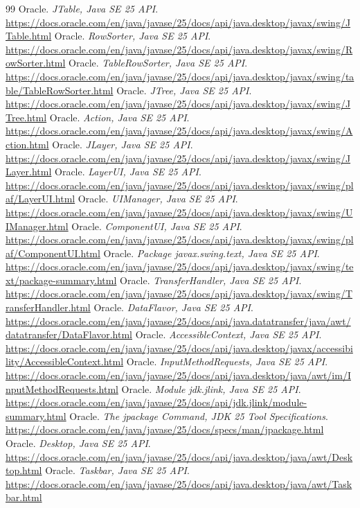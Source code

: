 \begin{thebibliography}{99}
 Oracle. \emph{JTable, Java SE 25 API}. \url{https://docs.oracle.com/en/java/javase/25/docs/api/java.desktop/javax/swing/JTable.html}
 Oracle. \emph{RowSorter, Java SE 25 API}. \url{https://docs.oracle.com/en/java/javase/25/docs/api/java.desktop/javax/swing/RowSorter.html}
 Oracle. \emph{TableRowSorter, Java SE 25 API}. \url{https://docs.oracle.com/en/java/javase/25/docs/api/java.desktop/javax/swing/table/TableRowSorter.html}
 Oracle. \emph{JTree, Java SE 25 API}. \url{https://docs.oracle.com/en/java/javase/25/docs/api/java.desktop/javax/swing/JTree.html}
 Oracle. \emph{Action, Java SE 25 API}. \url{https://docs.oracle.com/en/java/javase/25/docs/api/java.desktop/javax/swing/Action.html}
 Oracle. \emph{JLayer, Java SE 25 API}. \url{https://docs.oracle.com/en/java/javase/25/docs/api/java.desktop/javax/swing/JLayer.html}
 Oracle. \emph{LayerUI, Java SE 25 API}. \url{https://docs.oracle.com/en/java/javase/25/docs/api/java.desktop/javax/swing/plaf/LayerUI.html}
 Oracle. \emph{UIManager, Java SE 25 API}. \url{https://docs.oracle.com/en/java/javase/25/docs/api/java.desktop/javax/swing/UIManager.html}
 Oracle. \emph{ComponentUI, Java SE 25 API}. \url{https://docs.oracle.com/en/java/javase/25/docs/api/java.desktop/javax/swing/plaf/ComponentUI.html}
 Oracle. \emph{Package javax.swing.text, Java SE 25 API}. \url{https://docs.oracle.com/en/java/javase/25/docs/api/java.desktop/javax/swing/text/package-summary.html}
 Oracle. \emph{TransferHandler, Java SE 25 API}. \url{https://docs.oracle.com/en/java/javase/25/docs/api/java.desktop/javax/swing/TransferHandler.html}
 Oracle. \emph{DataFlavor, Java SE 25 API}. \url{https://docs.oracle.com/en/java/javase/25/docs/api/java.datatransfer/java/awt/datatransfer/DataFlavor.html}
 Oracle. \emph{AccessibleContext, Java SE 25 API}. \url{https://docs.oracle.com/en/java/javase/25/docs/api/java.desktop/javax/accessibility/AccessibleContext.html}
 Oracle. \emph{InputMethodRequests, Java SE 25 API}. \url{https://docs.oracle.com/en/java/javase/25/docs/api/java.desktop/java/awt/im/InputMethodRequests.html}
 Oracle. \emph{Module jdk.jlink, Java SE 25 API}. \url{https://docs.oracle.com/en/java/javase/25/docs/api/jdk.jlink/module-summary.html}
 Oracle. \emph{The jpackage Command, JDK 25 Tool Specifications}. \url{https://docs.oracle.com/en/java/javase/25/docs/specs/man/jpackage.html}
 Oracle. \emph{Desktop, Java SE 25 API}. \url{https://docs.oracle.com/en/java/javase/25/docs/api/java.desktop/java/awt/Desktop.html}
 Oracle. \emph{Taskbar, Java SE 25 API}. \url{https://docs.oracle.com/en/java/javase/25/docs/api/java.desktop/java/awt/Taskbar.html}
\end{thebibliography}
